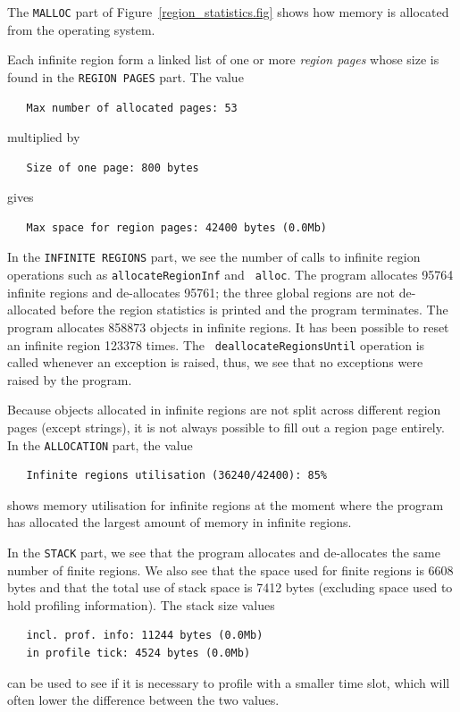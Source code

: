 \documentclass[12pt]{book}
\begin{document}
The {\tt MALLOC} part of Figure~\ref{region_statistics.fig} shows how
memory is allocated from the operating system.

Each infinite region form a linked list of one or more
% 
{\em region pages\/} whose size is found in the {\tt REGION PAGES}
part. The value
\begin{verbatim}
   Max number of allocated pages: 53
\end{verbatim}
multiplied by
\begin{verbatim}
   Size of one page: 800 bytes
\end{verbatim}
gives 
\begin{verbatim}
   Max space for region pages: 42400 bytes (0.0Mb)
\end{verbatim}

In the {\tt INFINITE REGIONS} part, we see the number of calls to
infinite region operations such as {\tt allocateRegionInf} and {\tt
  alloc}. The program allocates 95764 infinite regions and
de-allocates 95761; the three global regions are not de-allocated
before the region statistics is printed and the program terminates.
The program allocates 858873 objects in infinite regions. It has
been possible to reset an infinite region 123378 times. The {\tt
  deallocateRegionsUntil} operation is called whenever an exception is
raised, thus, we see that no exceptions were raised by the program.

Because objects allocated in infinite regions are not split across
different region pages (except strings), it is not always possible to
fill out a region page entirely. In the {\tt ALLOCATION} part, the value
\begin{verbatim}
   Infinite regions utilisation (36240/42400): 85%
\end{verbatim}
shows memory utilisation for infinite regions at the moment where the
program has allocated the largest amount of memory in infinite
regions.

In the {\tt STACK} part, we see that the program allocates and
de-allocates the same number of finite regions. We also see that the
space used for finite regions is 6608 bytes and that the total use of
stack space is 7412 bytes (excluding space used to hold profiling
information). The stack size values
\begin{verbatim}
   incl. prof. info: 11244 bytes (0.0Mb)
   in profile tick: 4524 bytes (0.0Mb)
\end{verbatim}
can be used to see if it is necessary to profile with a smaller time
slot, which will often lower the difference between the two values.
\end{document}
